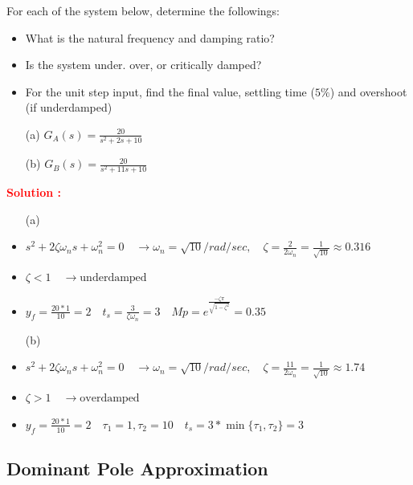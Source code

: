\documentclass[12pt]{article}
\begin{document}
For each of the system below, determine the followings:
\begin{itemize}
    \item What is the natural frequency and damping ratio?
    \item Is the system under. over, or critically damped?
    \item For the unit step input, find the final value, settling time (\(5\%\)) and overshoot (if underdamped)
\end{itemize}
\begin{itemize}
    \item[(a)] \(G_A(s) = \frac{20}{s^2+2s+10}\)
    \item[(b)] \(G_B(s) = \frac{20}{s^2+11s+10}\)
\end{itemize}
\textbf{\textcolor{red}{Solution :}} \\
\begin{itemize}
    \item[(a)]
    \item \(s^2+2\zeta \omega_n s + \omega_n^2 = 0 \quad \rightarrow \omega_n = \sqrt{10} / rad/sec, \quad \zeta = \frac{2}{2\omega_n} = \frac{1}{\sqrt{10}} \approx 0.316\)
    \item \(\zeta < 1 \quad \rightarrow \text{underdamped}\)
    \item \(y_f = \frac{20*1}{10} = 2 \quad t_s = \frac{3}{\zeta \omega_n} = 3 \quad Mp = e^{\frac{-\zeta \pi}{\sqrt{1-\zeta^2}}} = 0.35\)
    \item[(b)]
    \item \(s^2+2\zeta \omega_n s + \omega_n^2 = 0 \quad \rightarrow \omega_n = \sqrt{10} / rad/sec, \quad \zeta = \frac{11}{2\omega_n} = \frac{1}{\sqrt{10}} \approx 1.74\)
    \item \(\zeta > 1 \quad \rightarrow \text{overdamped}\)
    \item \(y_f = \frac{20*1}{10} = 2 \quad \tau_1 = 1, \tau_2 = 10 \quad t_s = 3*\min\{\tau_1,\tau_2\} 
 = 3\)
\end{itemize}

\clearpage
\subsection{Dominant Pole Approximation}
\end{document}
